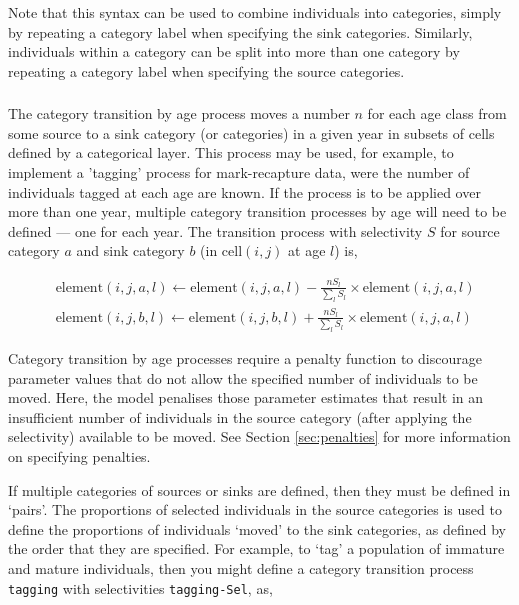 Note that this syntax can be used to combine individuals into categories, simply by repeating a category label when specifying the sink categories. Similarly, individuals within a category can be split into more than one category by repeating a category label when specifying the source categories.

\subsubsection*{}

The category transition by age process moves a number $n$ for each age class from some source to a sink category (or categories) in a given year in subsets of cells defined by a categorical layer. This process may be used, for example, to implement a 'tagging' process for mark-recapture data, were the number of individuals tagged at each age are known. If the process is to be applied over more than one year, multiple category transition processes by age will need to be defined --- one for each year. The transition process with selectivity $S$ for source category $a$ and sink category $b$ (in cell$(i,j)$ at age $l$) is,

\begin{equation}\begin{split}
  & \text{element}(i,j,a,l) \leftarrow \text{element}(i,j,a,l) - \frac{nS_l}{\sum\limits_l S_l} \times \text{element}(i,j,a,l) \\
  & \text{element}(i,j,b,l) \leftarrow \text{element}(i,j,b,l) + \frac{nS_l}{\sum\limits_l S_l} \times \text{element}(i,j,a,l)
\end{split}\end{equation}

Category transition by age processes require a penalty function to discourage parameter values that do not allow the specified number of individuals to be moved. Here, the model penalises those parameter estimates that result in an insufficient number of individuals in the source category (after applying the selectivity) available to be moved. See Section \ref{sec:penalties} for more information on specifying penalties.

If multiple categories of sources or sinks are defined, then they must be defined in `pairs'. The proportions of selected individuals in the source categories is used to define the proportions of individuals `moved' to the sink categories, as defined by the order that they are specified. For example, to `tag' a population of immature and mature individuals, then you might define a category transition process \texttt{tagging} with selectivities \texttt{tagging-Sel}, as,

